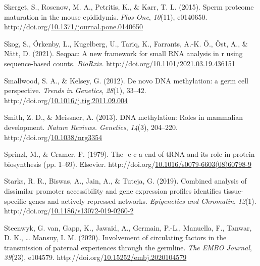 \documentclass[12pt,twoside]{reedthesis}
\newlength{\cslhangindent}
\newenvironment{CSLReferences}[2] %
 {%
  \setlength{\parindent}{0pt}
  \ifodd #1 \everypar{\setlength{\hangindent}{\cslhangindent}}\ignorespaces\fi
  \ifnum #2 > 0
  \setlength{\parskip}{#2\baselineskip}
  \fi
 }%
 {}
\begin{document}
\begin{CSLReferences}{1}{0}
\leavevmode{}%
Skerget, S., Rosenow, M. A., Petritis, K., \& Karr, T. L. (2015). Sperm proteome maturation in the mouse epididymis. \emph{Plos One}, \emph{10}(11), e0140650. http://doi.org/\href{https://doi.org/10.1371/journal.pone.0140650}{10.1371/journal.pone.0140650}

\leavevmode{}%
Skog, S., Örkenby, L., Kugelberg, U., Tariq, K., Farrants, A.-K. Ö., Öst, A., \& Nätt, D. (2021). Seqpac: A new framework for small RNA analysis in r using sequence-based counts. \emph{BioRxiv}. http://doi.org/\href{https://doi.org/10.1101/2021.03.19.436151}{10.1101/2021.03.19.436151}

\leavevmode{}%
Smallwood, S. A., \& Kelsey, G. (2012). De novo DNA methylation: a germ cell perspective. \emph{Trends in Genetics}, \emph{28}(1), 33--42. http://doi.org/\href{https://doi.org/10.1016/j.tig.2011.09.004}{10.1016/j.tig.2011.09.004}

\leavevmode{}%
Smith, Z. D., \& Meissner, A. (2013). DNA methylation: Roles in mammalian development. \emph{Nature Reviews. Genetics}, \emph{14}(3), 204--220. http://doi.org/\href{https://doi.org/10.1038/nrg3354}{10.1038/nrg3354}

\leavevmode{}%
Sprinzl, M., \& Cramer, F. (1979). The -c-c-a end of tRNA and its role in protein biosynthesis (pp. 1--69). Elsevier. http://doi.org/\href{https://doi.org/10.1016/s0079-6603(08)60798-9}{10.1016/s0079-6603(08)60798-9}

\leavevmode{}%
Starks, R. R., Biswas, A., Jain, A., \& Tuteja, G. (2019). Combined analysis of dissimilar promoter accessibility and gene expression profiles identifies tissue-specific genes and actively repressed networks. \emph{Epigenetics and Chromatin}, \emph{12}(1). http://doi.org/\href{https://doi.org/10.1186/s13072-019-0260-2}{10.1186/s13072-019-0260-2}

\leavevmode{}%
Steenwyk, G. van, Gapp, K., Jawaid, A., Germain, P.-L., Manuella, F., Tanwar, D. K., \ldots{} Mansuy, I. M. (2020). Involvement of circulating factors in the transmission of paternal experiences through the germline. \emph{The {EMBO} Journal}, \emph{39}(23), e104579. http://doi.org/\href{https://doi.org/10.15252/embj.2020104579}{10.15252/embj.2020104579}


\end{CSLReferences}
\end{document}
